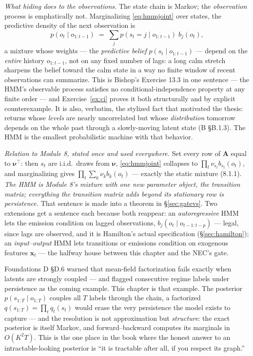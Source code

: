 \documentclass[11pt]{article}
\numberwithin{equation}{section}
\theoremstyle{plain}
\theoremstyle{definition}
\theoremstyle{remark}
\newcommand{\x}{\bm{x}}
\newcommand{\T}{\top}
\newcommand{\bA}{\bm{A}}
\newcommand{\bnu}{\bm{\nu}}
\begin{document}
\emph{What hiding does to the observations.} The state chain is Markov; the \emph{observation} process is emphatically not. Marginalizing \eqref{eq:hmmjoint} over states, the predictive density of the next observation is
\begin{equation}
p(o_t \mid o_{1:t-1})
\;=\; \sum_{j} p(s_t = j \mid o_{1:t-1})\; b_j(o_t),
\label{eq:predictive}
\end{equation}
a mixture whose weights --- the \emph{predictive belief} $p(s_t \mid o_{1:t-1})$ --- depend on the \emph{entire} history $o_{1:t-1}$, not on any fixed number of lags: a long calm stretch sharpens the belief toward the calm state in a way no finite window of recent observations can summarize. This is Bishop's Exercise 13.3 in one sentence --- the HMM's observable process satisfies no conditional-independence property at any finite order --- and Exercise~\ref{ex:ci} proves it both structurally and by explicit counterexample. It is also, verbatim, the stylized fact that motivated the thesis: returns whose \emph{levels} are nearly uncorrelated but whose \emph{distribution} tomorrow depends on the whole past through a slowly-moving latent state (B \S B.1.3). The HMM is the smallest probabilistic machine with that behavior.

\emph{Relation to Module 8, stated once and used everywhere.} Set every row of $\bA$ equal to $\bnu^\T$: then $s_t$ are i.i.d.\ draws from $\bnu$, \eqref{eq:hmmjoint} collapses to $\prod_t \nu_{s_t} b_{s_t}(o_t)$, and marginalizing gives $\prod_t \sum_k \nu_k b_k(o_t)$ --- exactly the static mixture (8.1.1). \emph{The HMM is Module 8's mixture with one new parameter object, the transition matrix; everything the transition matrix adds beyond its stationary row is persistence.} That sentence is made into a theorem in \S\ref{sec:gatevs}. Two extensions get a sentence each because both reappear: an \emph{autoregressive} HMM lets the emission condition on lagged observations, $b_j(o_t \mid o_{t-1:t-p})$ --- legal, since lags are observed, and it is Hamilton's actual specification (\S\ref{sec:hamilton}); an \emph{input--output} HMM lets transitions or emissions condition on exogenous features $\x_t$ --- the halfway house between this chapter and the NEC's gate.

\begin{necbox}
Foundations D \S D.6 warned that mean-field factorization fails exactly when latents are strongly coupled --- and flagged consecutive regime labels under persistence as the coming example. This chapter is that example. The posterior $p(s_{1:T} \mid o_{1:T})$ couples all $T$ labels through the chain, a factorized $q(s_{1:T}) = \prod_t q_t(s_t)$ would erase the very persistence the model exists to capture --- and the resolution is not approximation but \emph{structure}: the exact posterior is itself Markov, and forward--backward computes its marginals in $O(K^2 T)$. This is the one place in the book where the honest answer to an intractable-looking posterior is ``it is tractable after all, if you respect its graph.''
\end{necbox}
\end{document}
